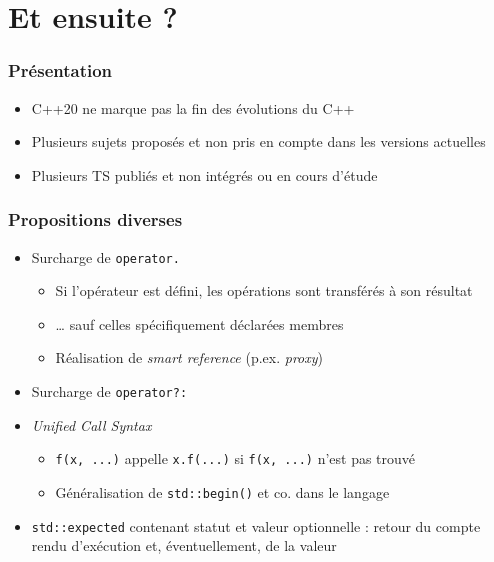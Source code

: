 \documentclass[C++.tex]{subfiles}
\begin{document}
\section{Et ensuite ?}

\begin{frame}
	\frametitle{Présentation}
	\begin{itemize}
		\item C++20 ne marque pas la fin des évolutions du C++
		\item Plusieurs sujets proposés et non pris en compte dans les versions actuelles
		\item Plusieurs TS publiés et non intégrés ou en cours d'étude
	\end{itemize}
\end{frame}

\begin{frame}
	\frametitle{Propositions diverses}
	\begin{itemize}
		\item Surcharge de \lstinline|operator.|
		\begin{itemize}
			\item Si l'opérateur est défini, les opérations sont transférés à son résultat
			\item \ldots{} sauf celles spécifiquement déclarées membres
			\item Réalisation de \textit{smart reference} (p.ex. \textit{proxy})
		\end{itemize}
		\item Surcharge de \lstinline|operator?:|
		\item \textit{Unified Call Syntax}
		\begin{itemize}
			\item \lstinline|f(x, ...)| appelle \lstinline|x.f(...)| si \lstinline|f(x, ...)| n'est pas trouvé
			\item Généralisation de \lstinline|std::begin()| et co. dans le langage
		\end{itemize}
		\item \lstinline|std::expected| contenant statut et valeur optionnelle : retour du compte rendu d'exécution et, éventuellement, de la valeur



\end{itemize}
\end{frame}
\end{document}
